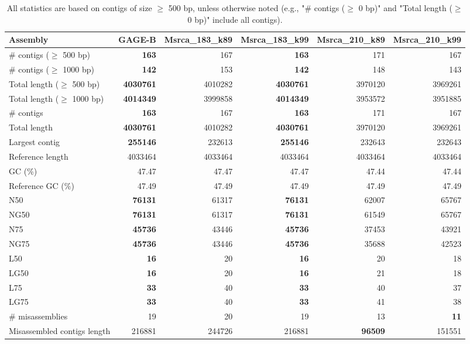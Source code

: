 \documentclass[12pt,a4paper]{article}
\begin{document}
\begin{table}[ht]
\begin{center}
\caption{All statistics are based on contigs of size $\geq$ 500 bp, unless otherwise noted (e.g., "\# contigs ($\geq$ 0 bp)" and "Total length ($\geq$ 0 bp)" include all contigs).}
\begin{tabular}{|l*{5}{|r}|}
\hline
Assembly & GAGE-B & Msrca\_183\_k89 & Msrca\_183\_k99 & Msrca\_210\_k89 & Msrca\_210\_k99 \\ \hline
\# contigs ($\geq$ 500 bp) & {\bf 163} & 167 & {\bf 163} & 171 & 167 \\ \hline
\# contigs ($\geq$ 1000 bp) & {\bf 142} & 153 & {\bf 142} & 148 & 143 \\ \hline
Total length ($\geq$ 500 bp) & {\bf 4030761} & 4010282 & {\bf 4030761} & 3970120 & 3969261 \\ \hline
Total length ($\geq$ 1000 bp) & {\bf 4014349} & 3999858 & {\bf 4014349} & 3953572 & 3951885 \\ \hline
\# contigs & {\bf 163} & 167 & {\bf 163} & 171 & 167 \\ \hline
Total length & {\bf 4030761} & 4010282 & {\bf 4030761} & 3970120 & 3969261 \\ \hline
Largest contig & {\bf 255146} & 232613 & {\bf 255146} & 232643 & 232643 \\ \hline
Reference length & 4033464 & 4033464 & 4033464 & 4033464 & 4033464 \\ \hline
GC (\%) & 47.47 & 47.47 & 47.47 & 47.44 & 47.44 \\ \hline
Reference GC (\%) & 47.49 & 47.49 & 47.49 & 47.49 & 47.49 \\ \hline
N50 & {\bf 76131} & 61317 & {\bf 76131} & 62007 & 65767 \\ \hline
NG50 & {\bf 76131} & 61317 & {\bf 76131} & 61549 & 65767 \\ \hline
N75 & {\bf 45736} & 43446 & {\bf 45736} & 37453 & 43921 \\ \hline
NG75 & {\bf 45736} & 43446 & {\bf 45736} & 35688 & 42523 \\ \hline
L50 & {\bf 16} & 20 & {\bf 16} & 20 & 18 \\ \hline
LG50 & {\bf 16} & 20 & {\bf 16} & 21 & 18 \\ \hline
L75 & {\bf 33} & 40 & {\bf 33} & 40 & 37 \\ \hline
LG75 & {\bf 33} & 40 & {\bf 33} & 41 & 38 \\ \hline
\# misassemblies & 19 & 20 & 19 & 13 & {\bf 11} \\ \hline
Misassembled contigs length & 216881 & 244726 & 216881 & {\bf 96509} & 151551 \\ \hline

\end{tabular}
\end{center}
\end{table}
\end{document}
